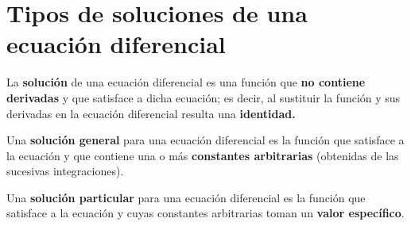 \documentclass[12pt]{article} %
\begin{document}
\section{Tipos de soluciones de una ecuación diferencial}
La \textbf{solución} de una ecuación diferencial es una función que \textbf{no contiene derivadas} y 
que satisface a dicha ecuación; es decir, al sustituir la función y sus derivadas en la ecuación diferencial 
resulta una \textbf{identidad.}

Una \textbf{solución general} para una ecuación diferencial es la función que satisface a la ecuación y que contiene una o más 
\textbf{constantes arbitrarias} (obtenidas de las sucesivas integraciones).

Una \textbf{solución particular} para una ecuación diferencial es la función que satisface a la ecuación y 
cuyas constantes arbitrarias toman un \textbf{valor específico}.
\end{document}
